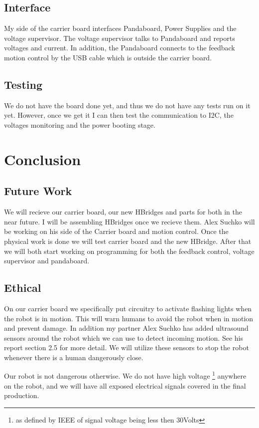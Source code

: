 \documentclass[12pt]{article}
\begin{document}
\subsection{Interface}
My side of the carrier board interfaces Pandaboard, Power Supplies and the voltage supervisor. The voltage supervisor talks to Pandaboard and reports voltages and current. In addition, the Pandaboard connects to the feedback motion control by the USB cable which is outside the carrier board.
\subsection{Testing}
We do not have the board done yet, and thus we do not have any tests run on it yet. However, once we get it I can then test the communication to I2C, the voltages monitoring and the power booting stage.
\section{Conclusion}
\subsection{Future Work}
We will recieve our carrier board, our new HBridges and parts for both in the near future. I will be assembling HBridges once we recieve them. Alex Suchko will be working on his side of the Carrier board and motion control. Once the physical work is done we will test carrier board and the new HBridge. After that we will both start working on programming for both the feedback control, voltage supervisor and pandaboard.
\subsection{Ethical}
On our carrier board we specifically put circuitry to activate flashing lights when the robot is in motion. This will warn humans to avoid the robot when in motion and prevent damage. In addition my partner Alex Suchko has added ultrasound sensors around the robot which we can use to detect incoming motion. See his report section 2.5 for more detail. We will utilize these sensors to stop the robot whenever there is a human dangerously close.

Our robot is not dangerous otherwise. We do not have high voltage \footnote{as defined by IEEE of signal voltage being less then 30Volts} anywhere on the robot, and we will have all exposed electrical signals covered in the final production.
\end{document}
